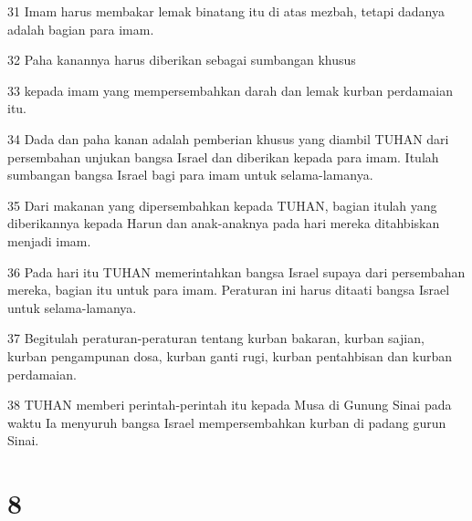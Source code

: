 \par 31 Imam harus membakar lemak binatang itu di atas mezbah, tetapi dadanya adalah bagian para imam.
\par 32 Paha kanannya harus diberikan sebagai sumbangan khusus
\par 33 kepada imam yang mempersembahkan darah dan lemak kurban perdamaian itu.
\par 34 Dada dan paha kanan adalah pemberian khusus yang diambil TUHAN dari persembahan unjukan bangsa Israel dan diberikan kepada para imam. Itulah sumbangan bangsa Israel bagi para imam untuk selama-lamanya.
\par 35 Dari makanan yang dipersembahkan kepada TUHAN, bagian itulah yang diberikannya kepada Harun dan anak-anaknya pada hari mereka ditahbiskan menjadi imam.
\par 36 Pada hari itu TUHAN memerintahkan bangsa Israel supaya dari persembahan mereka, bagian itu untuk para imam. Peraturan ini harus ditaati bangsa Israel untuk selama-lamanya.
\par 37 Begitulah peraturan-peraturan tentang kurban bakaran, kurban sajian, kurban pengampunan dosa, kurban ganti rugi, kurban pentahbisan dan kurban perdamaian.
\par 38 TUHAN memberi perintah-perintah itu kepada Musa di Gunung Sinai pada waktu Ia menyuruh bangsa Israel mempersembahkan kurban di padang gurun Sinai.

\chapter{8}

